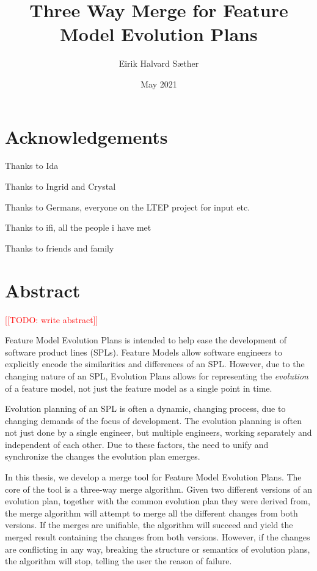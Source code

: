 \documentclass[a4paper,english]{ifimaster}
\title{Three Way Merge for Feature Model Evolution Plans}
\date{May 2021}
\author{Eirik Halvard Sæther}
\newcommand{\todo}[1]{\textcolor{red}{[[TODO: #1]]}\PackageWarning{TODO:}{#1!}}
\begin{document}
\duoforside[dept={Department of Informatics},
program={Informatics: Programming and Systems Architecture},
long]
\frontmatter{}

\chapter*{Acknowledgements}

Thanks to Ida

Thanks to Ingrid and Crystal

Thanks to Germans, everyone on the LTEP project for input etc.

Thanks to ifi, all the people i have met

Thanks to friends and family

\newpage
\thispagestyle{empty}
\mbox{}
\chapter*{Abstract}

\todo{write abstract}

Feature Model Evolution Plans is intended to help ease the development of software product lines (SPLs). Feature Models allow software engineers to explicitly encode the similarities and differences of an SPL. However, due to the changing nature of an SPL, Evolution Plans allows for representing the \textit{evolution} of a feature model, not just the feature model as a single point in time.

Evolution planning of an SPL is often a dynamic, changing process, due to changing demands of the focus of development. The evolution planning is often not just done by a single engineer, but multiple engineers, working separately and independent of each other. Due to these factors, the need to unify and synchronize the changes the evolution plan emerges.

In this thesis, we develop a merge tool for Feature Model Evolution Plans. The core of the tool is a three-way merge algorithm. Given two different versions of an evolution plan, together with the common evolution plan they were derived from, the merge algorithm will attempt to merge all the different changes from both versions. If the merges are unifiable, the algorithm will succeed and yield the merged result containing the changes from both versions. However, if the changes are conflicting in any way, breaking the structure or semantics of evolution plans, the algorithm will stop, telling the user the reason of failure.
\end{document}

